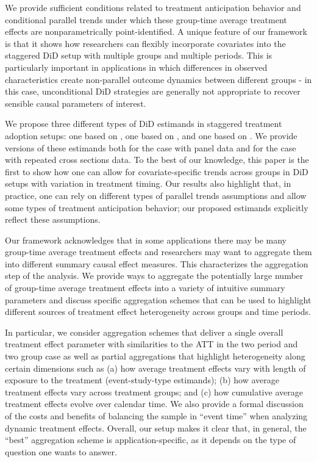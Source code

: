 \documentclass[12pt]{article}
\newcommand{\highlightP}[1]{{\emph{\color{MyPink}{#1}}}}
\theoremstyle{definition}
\begin{document}
We provide sufficient conditions related to treatment anticipation behavior and conditional parallel trends under which these group-time average treatment effects are nonparametrically point-identified. A unique feature of our framework is that it shows how researchers can flexibly incorporate covariates into the staggered DiD setup with multiple groups and multiple periods. This is particularly important in applications in which differences in observed characteristics create non-parallel outcome dynamics between different groups - in this case, unconditional DiD strategies are generally not appropriate to recover sensible causal parameters of interest.

We propose three different types of DiD estimands in staggered treatment adoption setups: one based on \highlightP{outcome regressions}, one based on \highlightP{inverse probability weighting}, and one based on \highlightP{doubly-robust methods}. We provide versions of these estimands both for the case with panel data and for the case with repeated cross sections data. To the best of our knowledge, this paper is the first to show how one can allow for covariate-specific trends across groups in DiD setups with variation in treatment timing. Our results also highlight that, in practice, one can rely on different types of parallel trends assumptions and allow some types of treatment anticipation behavior; our proposed estimands explicitly reflect these assumptions.

Our framework acknowledges that in some applications there may be many group-time average treatment effects and researchers may want to aggregate them into different summary causal effect measures. This characterizes the aggregation step of the analysis. We provide ways to aggregate the potentially large number of group-time average treatment effects into a variety of intuitive summary parameters and discuss specific aggregation schemes that can be used to highlight different sources of treatment effect heterogeneity across groups and time periods.

In particular, we consider aggregation schemes that deliver a single overall treatment effect parameter with similarities to the ATT in the two period and two group case as well as partial aggregations that highlight heterogeneity along certain dimensions such as (a) how average treatment effects vary with length of exposure to the treatment (event-study-type estimands); (b) how average treatment effects vary across treatment groups; and (c) how cumulative average treatment effects evolve over calendar time. We also provide a formal discussion of the costs and benefits of balancing the sample in ``event time'' when analyzing dynamic treatment effects. Overall, our setup makes it clear that, in general, the ``best'' aggregation scheme is application-specific, as it depends on the type of question one wants to answer. 
\end{document}
